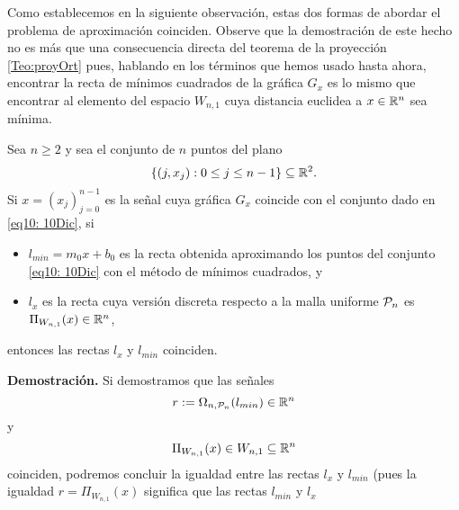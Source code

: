 \noindent Como establecemos en la siguiente observación, estas
dos formas de abordar el problema de aproximación
coinciden. Observe que la demostración de este hecho 
no es más que una consecuencia directa del 
teorema de la proyección \ref{Teo:proyOrt}
pues, hablando en los términos que hemos
usado hasta ahora, encontrar la recta de mínimos
cuadrados de la 
gráfica $G_{x}$ es lo mismo que encontrar al elemento
del espacio $W_{n,1}$ cuya distancia euclidea a $x \in \mathbb{R}^{n}$
sea mínima.


\begin{prop}
\label{prop: discretizacion recta minimos cuadrados}
Sea $n \geq 2$ y sea el conjunto de $n$ puntos del plano
\begin{equation}
\label{eq10: 10Dic}
\{(j, x_{j}): 0 \leq j \leq n-1 \}
\subseteq \mathbb{R}^{2}.
\end{equation}
Si $x=(x_{j})_{j=0}^{n-1}$ es la señal cuya
gráfica $G_{x}$ coincide con el conjunto dado
en \eqref{eq10: 10Dic}, si
\begin{itemize}
\item $l_{min}= m_{0}x+b_{0}$ es la recta obtenida 
aproximando los puntos del conjunto \eqref{eq10: 10Dic}
con el método de mínimos cuadrados, y

\item $l_{x}$ es la recta cuya versión discreta 
respecto a la malla uniforme $\mathcal{P}_{n}$
es $\Pi_{W_{n,1}}(x) \in \mathbb{R}^{n}$, 

\end{itemize} 
entonces las rectas $l_{x}$ y $l_{min}$ coinciden.
\end{prop}
\noindent 
\textbf{Demostración.}
Si demostramos que las señales
\[
r:= \Omega_{n, \mathcal{P}_{n}}(l_{min}) \in \mathbb{R}^{n}
\]
y
\[
\Pi_{W_{n,1}}(x) \in W_{n,1} \subseteq \mathbb{R}^{n}
\]
coinciden, podremos concluir la 
igualdad entre las rectas $l_{x}$ y $l_{min}$
(pues la igualdad $r= \Pi_{W_{n,1}}(x)$
significa que las rectas $l_{min}$ y $l_{x}$
